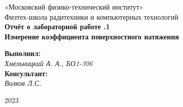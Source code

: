 
\pagecolor{default_color}


\pagecolor{white}
\pagestyle{fancy}
\fancyhf{}
\rfoot{}


\thispagestyle{empty}

\begin{center}
\large{«Московский физико-технический институт»} \\  
\large{Физтех-школа радитехники и компьютерных технологий }\\
\vspace*{6cm}
{\bfseries
    {\Huge Отчёт о лабораторной работе .1  \vspace*{0.5cm} \\ Измерение коэффициента поверхностного натяжения}
}
\end{center}

\vspace*{1cm}
\begin{flushright}
    \large{
    \textbf{Выполнил:} \\ \textit{ Хмельницкий А. А., БО1-306} \\
    \textbf{Консультант:} \\ \textit{Волков Л.С.}
    }
\end{flushright}

\vspace*{11cm}
\begin{center}
2023
\end{center}

\newpage
